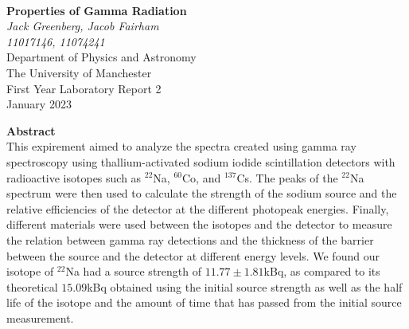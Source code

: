\documentclass[12pt, a4paper]{article}
\begin{document}
\begin{center}

\noindent \\[10pt]
\color{black}

\thispagestyle{empty} %

\Large{\textbf{Properties of Gamma Radiation}} \\[30pt]
\normalsize \textit{Jack Greenberg, Jacob Fairham}\\[5pt]
\textit{11017146,  11074241}\\[20pt]
Department of Physics and Astronomy \\[5pt]
The University of Manchester \\[20pt]
First Year Laboratory Report 2 \\[20pt]
January 2023 \\[25pt]

\end{center}

\textbf{Abstract}\\[12pt]
This expirement aimed to analyze the spectra created using gamma ray spectroscopy using thallium-activated sodium iodide scintillation detectors with radioactive isotopes such as $^{22}$Na, $^{60}$Co, and $^{137}$Cs. The peaks of the $^{22}$Na spectrum were then used to calculate the strength of the sodium source and the relative efficiencies of the detector at the different photopeak energies. Finally, different materials were used between the isotopes and the detector to measure the relation between gamma ray detections and the thickness of the barrier between the source and the detector at different energy levels. We found our isotope of $^{22}$Na had a source strength of $11.77\pm1.81$kBq, as compared to its theoretical $15.09$kBq obtained using the initial source strength as well as the half life of the isotope and the amount of time that has passed from the initial source measurement.

\noindent 

\pagebreak
\end{document}
